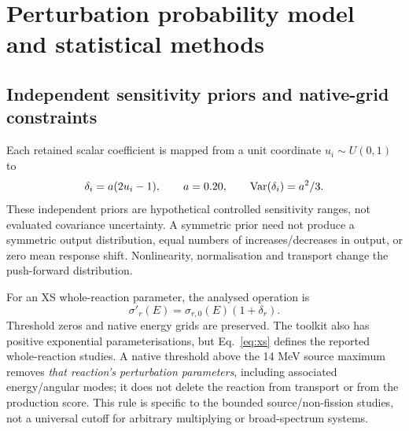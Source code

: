 \section{Perturbation probability model and statistical methods}
\label{sec:methods}
\subsection{Independent sensitivity priors and native-grid constraints}
Each retained scalar coefficient is mapped from a unit coordinate $u_i\sim U(0,1)$ to
\begin{equation}
\delta_i=a(2u_i-1),\qquad a=0.20,\qquad \operatorname{Var}(\delta_i)=a^2/3.\label{eq:prior}
\end{equation}
These independent priors are hypothetical controlled sensitivity ranges, not evaluated covariance uncertainty. A symmetric prior need not produce a symmetric output distribution, equal numbers of increases/decreases in output, or zero mean response shift. Nonlinearity, normalisation and transport change the push-forward distribution.

For an XS whole-reaction parameter, the analysed operation is
\begin{equation}
\sigma'_r(E)=\sigma_{r,0}(E)(1+\delta_r).\label{eq:xs}
\end{equation}
Threshold zeros and native energy grids are preserved. The toolkit also has positive exponential parameterisations, but Eq.~\eqref{eq:xs} defines the reported whole-reaction studies. A native threshold above the 14 MeV source maximum removes \emph{that reaction's perturbation parameters}, including associated energy/angular modes; it does not delete the reaction from transport or from the production score. This rule is specific to the bounded source/non-fission studies, not a universal cutoff for arbitrary multiplying or broad-spectrum systems.

